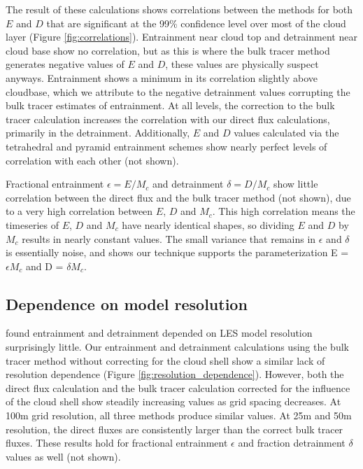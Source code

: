 \documentclass[12pt]{article}
\begin{document}
The result of these calculations shows correlations between the methods for 
both $E$ and $D$ that are significant at the 99\% confidence level over most 
of the cloud layer (Figure \ref{fig:correlations}).  Entrainment near cloud top
and detrainment near cloud base show no correlation, but as this is where the 
bulk tracer method generates negative values of $E$ and $D$, these values are 
physically suspect anyways.  Entrainment shows a minimum in its correlation 
slightly above cloudbase, which we attribute to the negative detrainment values 
corrupting the bulk tracer estimates of entrainment.  At all levels, the 
correction to the bulk tracer calculation increases the correlation with our 
direct flux calculations, primarily in the detrainment. Additionally, $E$ and 
$D$ values calculated via the tetrahedral and pyramid entrainment schemes show 
nearly perfect levels of correlation with each other (not shown).

Fractional entrainment $\epsilon = E/M_c$ and detrainment $\delta = D/M_c$ show 
little correlation between the direct flux and the bulk tracer method (not 
shown), due to a very high correlation between $E$, $D$ and $M_c$.  This high 
correlation means the timeseries of $E$, $D$ and $M_c$ have nearly identical 
shapes, so dividing $E$ and $D$ by $M_c$ results in nearly constant values. The
small variance that remains in $\epsilon$ and $\delta$ is essentially noise, 
and shows our technique supports the parameterization E = $\epsilon M_c$ and 
D = $\delta M_c$.


\subsection{Dependence on model resolution}

\cite{Brown1999} found entrainment and detrainment depended on LES model 
resolution surprisingly little.  Our entrainment and detrainment calculations 
using the bulk tracer method without correcting for the cloud shell show a
similar lack of resolution dependence (Figure \ref{fig:resolution_dependence}).
However, both the direct flux calculation and the bulk tracer calculation 
corrected for the influence of the cloud shell show steadily increasing values 
as grid spacing decreases.  At 100m grid resolution, all three methods produce
similar values.  At 25m and 50m resolution, the direct fluxes are consistently 
larger than the correct bulk tracer fluxes.  These results hold for fractional
entrainment $\epsilon$ and fraction detrainment $\delta$ values as well (not
shown).  
\end{document}
